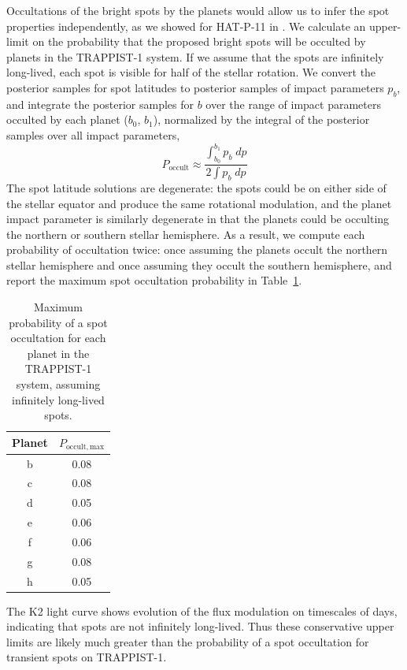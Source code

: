 \begin{subappendices}
Occultations of the bright spots by the planets would allow us to infer the spot properties independently, as we showed for HAT-P-11 in \citet{Morris2017a}. We calculate an upper-limit on the probability that the proposed bright spots will be occulted by planets in the TRAPPIST-1 system. If we assume that the spots are infinitely long-lived, each spot is visible for half of the stellar rotation. We convert the posterior samples for spot latitudes to posterior samples of impact parameters $p_b$, and integrate the posterior samples for $b$ over the range of impact parameters occulted by each planet ($b_0$, $b_1$), normalized by the integral of the posterior samples over all impact parameters, 
\begin{equation}
P_\mathrm{occult} \approx \frac{\int_{b_0}^{b_1} p_b \; dp}{2 \int p_b \; dp} 
\end{equation}
The spot latitude solutions are degenerate: the spots could be on either side of the stellar equator and produce the same rotational modulation, and the planet impact parameter is similarly degenerate in that the planets could be occulting the northern or southern stellar hemisphere. As a result, we compute each probability of occultation twice: once assuming the planets occult the northern stellar hemisphere and once assuming they occult the southern hemisphere, and report the maximum spot occultation probability in Table~\ref{tab:prob_occ}. 

\begin{table}
\centering
\begin{tabular}{cc}
Planet & $P_\mathrm{occult, max}$ \\ \hline
b & 0.08 \\
c & 0.08 \\
d & 0.05 \\
e & 0.06 \\
f & 0.06\\
g & 0.08 \\
h & 0.05 \\
\end{tabular}
\caption{Maximum probability of a spot occultation for each planet in the TRAPPIST-1 system, assuming infinitely long-lived spots.\label{tab:prob_occ}}
\end{table}

The K2 light curve shows evolution of the flux modulation on timescales of days, indicating that spots are not infinitely long-lived. Thus these conservative upper limits are likely much greater than the probability of a spot occultation for transient spots on TRAPPIST-1.

\end{subappendices}


% 
%


% 